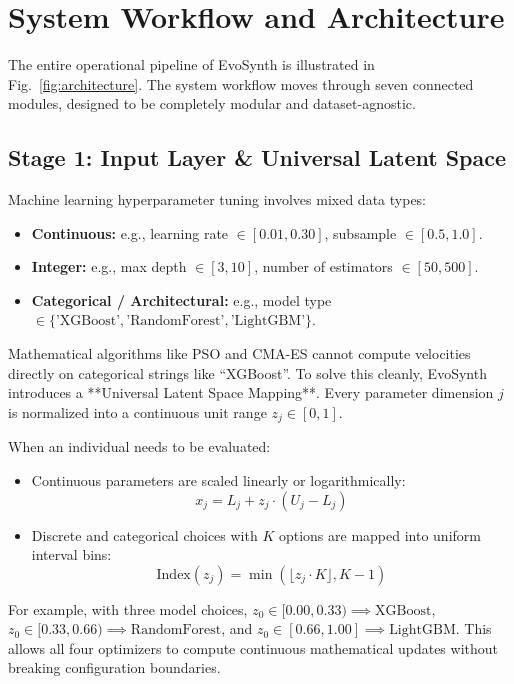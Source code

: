 \documentclass[conference]{IEEEtran}
\begin{document}
\section{System Workflow and Architecture}

The entire operational pipeline of EvoSynth is illustrated in Fig.~\ref{fig:architecture}. The system workflow moves through seven connected modules, designed to be completely modular and dataset-agnostic.

\subsection{Stage 1: Input Layer & Universal Latent Space}
Machine learning hyperparameter tuning involves mixed data types:
\begin{itemize}
    \item \textbf{Continuous:} e.g., learning rate $\in [0.01, 0.30]$, subsample $\in [0.5, 1.0]$.
    \item \textbf{Integer:} e.g., max depth $\in [3, 10]$, number of estimators $\in [50, 500]$.
    \item \textbf{Categorical / Architectural:} e.g., model type $\in \{\text{'XGBoost'}, \text{'RandomForest'}, \text{'LightGBM'}\}$.
\end{itemize}

Mathematical algorithms like PSO and CMA-ES cannot compute velocities directly on categorical strings like ``XGBoost''. To solve this cleanly, EvoSynth introduces a **Universal Latent Space Mapping**. Every parameter dimension $j$ is normalized into a continuous unit range $z_j \in [0, 1]$.

When an individual needs to be evaluated:
\begin{itemize}
    \item Continuous parameters are scaled linearly or logarithmically:
    \begin{equation}
    x_j = L_j + z_j \cdot (U_j - L_j)
    \end{equation}
    \item Discrete and categorical choices with $K$ options are mapped into uniform interval bins:
    \begin{equation}
    \text{Index}(z_j) = \min\left(\lfloor z_j \cdot K \rfloor, K - 1\right)
    \end{equation}
\end{itemize}
For example, with three model choices, $z_0 \in [0.00, 0.33) \implies \text{XGBoost}$, $z_0 \in [0.33, 0.66) \implies \text{RandomForest}$, and $z_0 \in [0.66, 1.00] \implies \text{LightGBM}$. This allows all four optimizers to compute continuous mathematical updates without breaking configuration boundaries.
\end{document}
